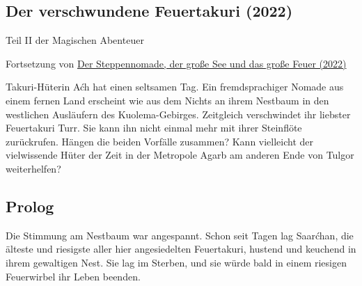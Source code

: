 \begin{chapterbox}
    \chapter{Der verschwundene Feuertakuri (2022)}
    \label{2022-der-verschwundene-feuertakuri}

    \begin{center}
        Teil II der Magischen Abenteuer
        
        Fortsetzung von \hyperref[2022-der-steppennomade-der-grosse-see-und-das-grosse-feuer]{Der Steppennomade, der große See und das große Feuer (2022)}
    \end{center}
    
    Takuri-Hüterin Aćh hat einen seltsamen Tag. Ein fremdsprachiger Nomade aus einem fernen Land erscheint wie aus dem Nichts an ihrem Nestbaum in den westlichen Ausläufern des Kuolema-Gebirges. Zeitgleich verschwindet ihr liebster Feuertakuri Turr. Sie kann ihn nicht einmal mehr mit ihrer Steinflöte zurückrufen. Hängen die beiden Vorfälle zusammen? Kann vielleicht der vielwissende Hüter der Zeit in der Metropole Agarb am anderen Ende von Tulgor weiterhelfen?

\end{chapterbox}





\newpage
\section{Prolog}


Die Stimmung am Nestbaum war angespannt. Schon seit Tagen lag Saarćhan, die älteste und riesigste aller hier angesiedelten Feuertakuri, hustend und keuchend in ihrem gewaltigen Nest. Sie lag im Sterben, und sie würde bald in einem riesigen Feuerwirbel ihr Leben beenden.

